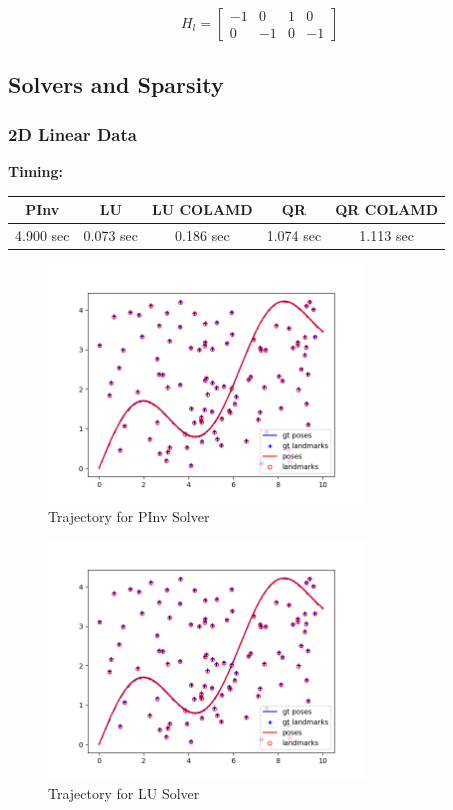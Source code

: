 \documentclass[12pt, a4paper]{article}
\begin{document}
$$H_l = \begin{bmatrix}
    -1 & 0 & 1 & 0 \\
    0  & -1 & 0 & -1
\end{bmatrix}$$

\subsection{Solvers and Sparsity}
\subsubsection{2D Linear Data}
\textbf{Timing:}

\begin{tabular}{|c | c | c | c | c|}
    \hline
    \textbf{PInv} & \textbf{LU} & \textbf{LU COLAMD} & \textbf{QR} & \textbf{QR COLAMD} \\
    \hline
    \hline
    4.900 sec & 0.073 sec & 0.186 sec & 1.074 sec & 1.113 sec \\
    \hline
\end{tabular}

\begin{figure}
    \center
    \includegraphics[width=0.75\textwidth]{linear_results/PInv_Traj.png}
    \caption{Trajectory for PInv Solver}
\end{figure}

\begin{figure}
    \center
    \includegraphics[width=0.75\textwidth]{linear_results/LU_Factor_Traj.png}
    \caption{Trajectory for LU Solver}
\end{figure}
\end{document}
